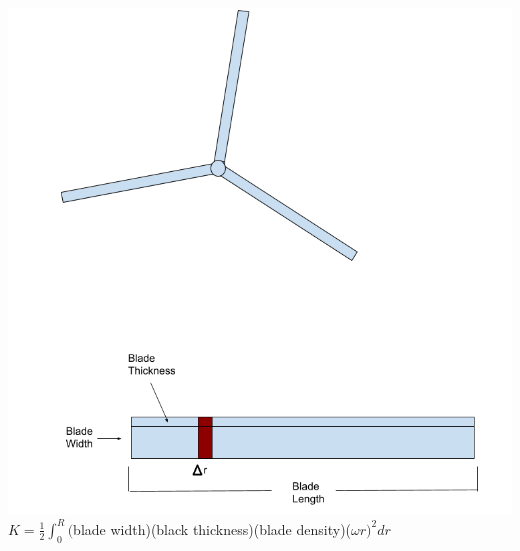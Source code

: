 \documentclass[a4paper, 11pt, oneside]{book} %
\begin{document}
{\includegraphics[scale=0.5]{blade}\\
\vspace{0.5\baselineskip} %
$K = \frac{1}{2}\int_{0}^{R}($blade width)(black thickness)(blade density)($\omega r)^2dr$

}
\end{document}
